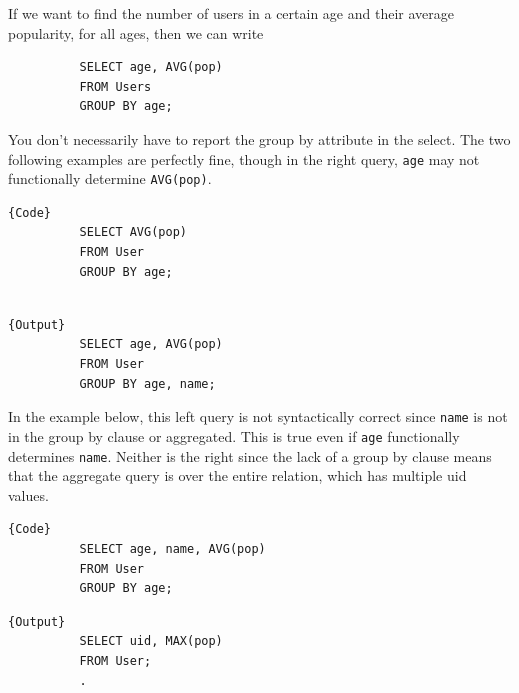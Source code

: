 \documentclass{article}
\begin{document}
      \begin{example}
        If we want to find the number of users in a certain age and their average popularity, for all ages, then we can write 
        \begin{lstlisting}
          SELECT age, AVG(pop) 
          FROM Users
          GROUP BY age; 
        \end{lstlisting}
        You don't necessarily have to report the group by attribute in the select. The two following examples are perfectly fine, though in the right query, \texttt{age} may not functionally determine \texttt{AVG(pop)}. 

        \noindent\begin{minipage}{.5\textwidth}
        \begin{lstlisting}[]{Code}
          SELECT AVG(pop) 
          FROM User
          GROUP BY age; 
          
        \end{lstlisting}
        \end{minipage}
        \hfill
        \begin{minipage}{.49\textwidth}
        \begin{lstlisting}[]{Output}
          SELECT age, AVG(pop)  
          FROM User 
          GROUP BY age, name; 
        \end{lstlisting}
        \end{minipage}

        In the example below, this left query is not syntactically correct since \texttt{name} is not in the group by clause or aggregated. This is true even if \texttt{age} functionally determines \texttt{name}. Neither is the right since the lack of a group by clause means that the aggregate query is over the entire relation, which has multiple uid values. 

        \noindent\begin{minipage}{.5\textwidth}
        \begin{lstlisting}[]{Code}
          SELECT age, name, AVG(pop) 
          FROM User
          GROUP BY age; 
        \end{lstlisting}
        \end{minipage}
        \hfill
        \begin{minipage}{.49\textwidth}
        \begin{lstlisting}[]{Output}
          SELECT uid, MAX(pop) 
          FROM User; 
          .
        \end{lstlisting}
        \end{minipage}
      \end{example}
\end{document}
